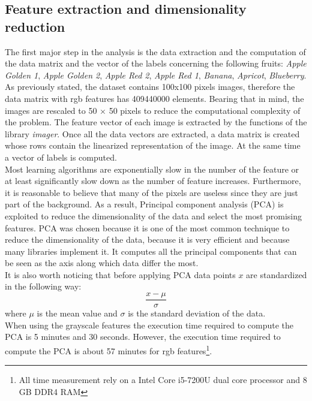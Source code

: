 \documentclass{article}
\begin{document}
\subsection{Feature extraction and dimensionality reduction}
The first major step in the analysis is the data extraction and the computation of the data matrix and the vector of the labels concerning the following fruits: \textit{Apple Golden 1}, \textit{Apple Golden 2}, \textit{Apple Red 2}, \textit{Apple Red 1}, \textit{Banana}, \textit{Apricot}, \textit{Blueberry}. \\
As previously stated, the dataset contains 100x100 pixels images, therefore the data matrix with rgb features has 409440000 elements. Bearing that in mind, the images are rescaled to 50 $\times$ 50 pixels to reduce the computational complexity of the problem.  The feature vector of each image is extracted by the functions of the library \textit{imager}. Once all the data vectors are extracted, a data matrix is created whose rows contain the linearized representation of the image. At the same time a vector of labels is computed.\\
Most learning algorithms are exponentially slow in the number of the feature or at least significantly slow down as the number of feature increases. Furthermore, it is reasonable to believe that many of the pixels are useless since they are just part of the background. As a result, Principal component analysis (PCA) is exploited to reduce the dimensionality of the data and select the most promising features. PCA was chosen because it is one of the most common technique to reduce the dimensionality of the data, because it is very efficient and because many libraries implement it. It computes all the principal components that can be seen as the axis along which data differ the most.\\
It is also worth noticing that before applying PCA data points $x$ are standardized in the following way:
\begin{equation}
 \frac{x - \mu}{\sigma}
\end{equation}
\noindent where $\mu$ is the mean value and $\sigma$ is the standard deviation of the data. \\
When using the grayscale features the execution time required to compute the PCA is 5 minutes and 30 seconds. However, the execution time required to compute the PCA is about 57 minutes for rgb features\footnote{All time measurement rely on a Intel Core i5-7200U dual core processor and 8 GB DDR4 RAM}.
\end{document}
